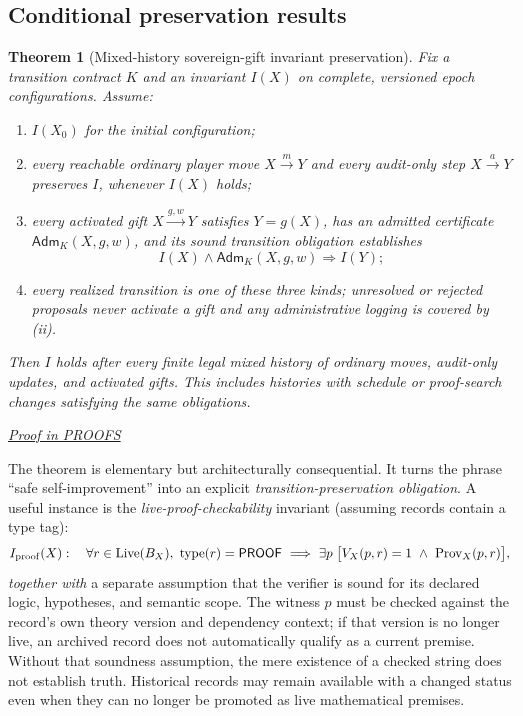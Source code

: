 \documentclass[11pt,letterpaper]{article}
\newtheorem{theorem}{Theorem}[section]
\theoremstyle{definition}\newtheorem{definition}[theorem]{Definition}\newtheorem{example}[theorem]{Example}
\theoremstyle{remark}\newtheorem{remark}[theorem]{Remark}
\newcommand{\Adm}{\mathsf{Adm}}
\newcommand{\prooflink}[1]{\par\noindent\hfill\small\hyperref[#1]{\textit{Proof in PROOFS}}\normalsize}
\providecommand{\Prov}{\operatorname{Prov}}
\providecommand{\Live}{\operatorname{Live}}
\begin{document}
\subsection{Conditional preservation results}
\begin{theorem}[Mixed-history sovereign-gift invariant preservation]\label{mvsi:thm:invariant}
Fix a transition contract $K$ and an invariant $I(X)$ on complete, versioned epoch configurations. Assume:
\begin{enumerate}[label=(\roman*)]
\item $I(X_0)$ for the initial configuration;
\item every reachable ordinary player move $X\xrightarrow{m}Y$ and every audit-only step $X\xrightarrow{a}Y$ preserves $I$, whenever $I(X)$ holds;
\item every activated gift $X\xrightarrow{g,w}Y$ satisfies $Y=g(X)$, has an admitted certificate $\Adm_K(X,g,w)$, and its sound transition obligation establishes
\[
I(X)\wedge\Adm_K(X,g,w)\Longrightarrow I(Y);
\]
\item every realized transition is one of these three kinds; unresolved or rejected proposals never activate a gift and any administrative logging is covered by (ii).
\end{enumerate}
Then $I$ holds after every finite legal mixed history of ordinary moves, audit-only updates, and activated gifts. This includes histories with schedule or proof-search changes satisfying the same obligations.
\end{theorem}
\label{br:mvsi:stmt:1}\prooflink{br:mvsi:proof:1}


The theorem is elementary but architecturally consequential. It turns the phrase ``safe self-improvement'' into an explicit \emph{transition-preservation obligation}. A useful instance is the \emph{live-proof-checkability} invariant (assuming records contain a type tag):
\begin{equation}\label{mvsi:eq:ledger}
I_{\rm proof}(X):\quad
\forall r\in\Live(B_X),\ \operatorname{type}(r)=\mathsf{PROOF}\ \Longrightarrow\ 
\exists p\;\bigl[V_X(p,r)=1\ \wedge\ \Prov_X(p,r)\bigr],
\end{equation}
\emph{together with} a separate assumption that the verifier is sound for its declared logic, hypotheses, and semantic scope. The witness $p$ must be checked against the record's own theory version and dependency context; if that version is no longer live, an archived record does not automatically qualify as a current premise. Without that soundness assumption, the mere existence of a checked string does not establish truth. Historical records may remain available with a changed status even when they can no longer be promoted as live mathematical premises.
\end{document}

